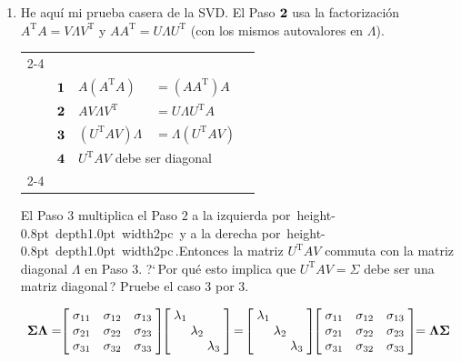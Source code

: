 \documentclass[12pt,a4paper]{article}
\newcommand{\bi}[1]{\hbox{\boldmath$#1$}}
\newcommand\1{\mbox{\,\vrule height-0.8pt depth1.0pt width2pc\,}}
\newcommand\2{\mbox{\,\vrule height-0.8pt depth1.0pt width1pc\,}}
\DeclareRobustCommand\transp{^{\mathrm{T}}}
\begin{document}
\begin{enumerate}
\item He aqu\'i mi prueba casera de la SVD. El Paso $\bi{2}$ usa la factorizaci\'on %
$A\transp A=V\Lambda V\transp$ y $AA\transp=U\Lambda U\transp$ (con los mismos autovalores en $\Lambda$).

\begin{center}
\begin{tabular}{l|ll@{\quad}l|l}\cline{2-4}
&&&\multicolumn{1}{c|}{\;}\\[-5pt]
&$\bi{1}$&$A(A\transp A)$&$=(AA\transp)A$&\\
 &$\bi{2}$&$AV\Lambda V\transp$&$=U\Lambda U\transp A$&\\
&$\bi{3}$&$(U\transp AV)\Lambda$&$=\Lambda(U\transp AV)$&\\
&$\bi{4}$&\multicolumn{2}{l|}{$U\transp AV$ debe ser diagonal}&\\[5pt]\cline{2-4}
\end{tabular}
\end{center}

\noindent
El Paso $3$ multiplica el Paso $2$ a la izquierda por \1 y a la derecha por \1.\linebreak Entonces la matriz $U\transp AV$ commuta con la matriz diagonal $\Lambda$ en Paso $3$. ?`\,Por qué esto implica que $U\transp AV=\Sigma$ debe ser una matriz diagonal\,? Pruebe el caso $3$ por $3$. %

\vspace{-11pt}
$$
\bi{\Sigma\Lambda}=\!\!\left[\begin{array}{@{\;}rrr@{\;}}\sigma_{11}&\sigma_{12}&\sigma_{13}\\\sigma_{21}&\sigma_{22}&\sigma_{23}\\\sigma_{31}&\sigma_{32}&\sigma_{33}\\\end{array}\right]\!\!\left[\begin{array}{@{\;}r@{\;}r@{\;}r@{\;}}\lambda_1&&\\&\lambda_2&\\&&\lambda_3\\\end{array}\right]\!=\!\left[\begin{array}{@{\;}r@{\;}r@{\;}r@{\;}}\lambda_1&&\\&\lambda_2&\\&&\lambda_3\\\end{array}\right]\!\!\left[\begin{array}{@{\;}rrr@{\;}}\sigma_{11}&\sigma_{12}&\sigma_{13}\\\sigma_{21}&\sigma_{22}&\sigma_{23}\\\sigma_{31}&\sigma_{32}&\sigma_{33}\\\end{array}\right]\!\!=\bi{\Lambda\Sigma}
$$


\end{enumerate}
\end{document}
